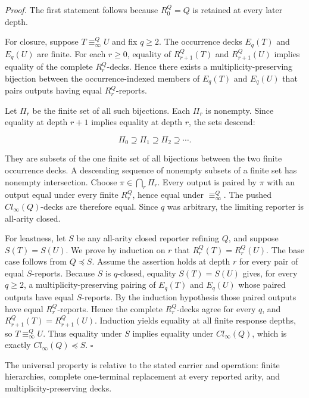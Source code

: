 \documentclass[11pt,a4paper]{article}
\begin{document}
\emph{Proof.} The first statement follows because \(R_{0}^{Q} = Q\) is
retained at every later depth.

For closure, suppose \(T \equiv_{\infty}^{Q}U\) and fix \(q \geq 2\).
The occurrence decks \(E_{q}(T)\) and \(E_{q}(U)\) are finite. For each
\(r \geq 0\), equality of \(R_{r + 1}^{Q}(T)\) and \(R_{r + 1}^{Q}(U)\)
implies equality of the complete \(R_{r}^{Q}\)-decks. Hence there exists
a multiplicity-preserving bijection between the occurrence-indexed
members of \(E_{q}(T)\) and \(E_{q}(U)\) that pairs outputs having equal
\(R_{r}^{Q}\)-reports.

Let \(\Pi_{r}\) be the finite set of all such bijections. Each
\(\Pi_{r}\) is nonempty. Since equality at depth \(r + 1\) implies
equality at depth \(r\), the sets descend:

\[\Pi_{0} \supseteq \Pi_{1} \supseteq \Pi_{2} \supseteq \cdots.\]

They are subsets of the one finite set of all bijections between the two
finite occurrence decks. A descending sequence of nonempty subsets of a
finite set has nonempty intersection. Choose
\(\pi \in \bigcap_{r}\Pi_{r}\). Every output is paired by \(\pi\) with
an output equal under every finite \(R_{r}^{Q}\), hence equal under
\(\equiv_{\infty}^{Q}\). The pushed \({Cl}_{\infty}(Q)\)-decks are
therefore equal. Since \(q\) was arbitrary, the limiting reporter is
all-arity closed.

For leastness, let \(S\) be any all-arity closed reporter refining
\(Q\), and suppose \(S(T) = S(U)\). We prove by induction on \(r\) that
\(R_{r}^{Q}(T) = R_{r}^{Q}(U)\). The base case follows from
\(Q \preccurlyeq S\). Assume the assertion holds at depth \(r\) for
every pair of equal \(S\)-reports. Because \(S\) is \(q\)-closed,
equality \(S(T) = S(U)\) gives, for every \(q \geq 2\), a
multiplicity-preserving pairing of \(E_{q}(T)\) and \(E_{q}(U)\) whose
paired outputs have equal \(S\)-reports. By the induction hypothesis
those paired outputs have equal \(R_{r}^{Q}\)-reports. Hence the
complete \(R_{r}^{Q}\)-decks agree for every \(q\), and
\(R_{r + 1}^{Q}(T) = R_{r + 1}^{Q}(U)\). Induction yields equality at
all finite response depths, so \(T \equiv_{\infty}^{Q}U\). Thus equality
under \(S\) implies equality under \({Cl}_{\infty}(Q)\), which is
exactly \({Cl}_{\infty}(Q) \preccurlyeq S\). \(\ensuremath{\square}\)

The universal property is relative to the stated carrier and operation:
finite hierarchies, complete one-terminal replacement at every reported
arity, and multiplicity-preserving decks.
\end{document}

